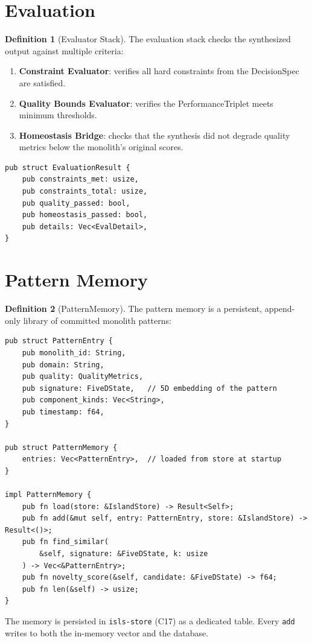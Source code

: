 \documentclass[11pt,a4paper,twoside]{article}
\theoremstyle{definition}
\newtheorem{definition}{Definition}[section]
\theoremstyle{plain}
\theoremstyle{remark}
\begin{document}
\section{Evaluation}\label{sec:forge:eval}

\begin{definition}[Evaluator Stack]\label{def:evalstack}
The evaluation stack checks the synthesized output against multiple
criteria:
\begin{enumerate}[nosep,label=(\roman*)]
  \item \textbf{Constraint Evaluator}: verifies all hard constraints
        from the DecisionSpec are satisfied.
  \item \textbf{Quality Bounds Evaluator}: verifies the
        PerformanceTriplet meets minimum thresholds.
  \item \textbf{Homeostasis Bridge}: checks that the synthesis did not
        degrade quality metrics below the monolith's original scores.
\end{enumerate}
\begin{lstlisting}
pub struct EvaluationResult {
    pub constraints_met: usize,
    pub constraints_total: usize,
    pub quality_passed: bool,
    pub homeostasis_passed: bool,
    pub details: Vec<EvalDetail>,
}
\end{lstlisting}
\end{definition}


\section{Pattern Memory}\label{sec:forge:memory}

\begin{definition}[PatternMemory]\label{def:patternmem}
The pattern memory is a persistent, append-only library of committed
monolith patterns:
\begin{lstlisting}
pub struct PatternEntry {
    pub monolith_id: String,
    pub domain: String,
    pub quality: QualityMetrics,
    pub signature: FiveDState,   // 5D embedding of the pattern
    pub component_kinds: Vec<String>,
    pub timestamp: f64,
}

pub struct PatternMemory {
    entries: Vec<PatternEntry>,  // loaded from store at startup
}

impl PatternMemory {
    pub fn load(store: &IslandStore) -> Result<Self>;
    pub fn add(&mut self, entry: PatternEntry, store: &IslandStore) -> Result<()>;
    pub fn find_similar(
        &self, signature: &FiveDState, k: usize
    ) -> Vec<&PatternEntry>;
    pub fn novelty_score(&self, candidate: &FiveDState) -> f64;
    pub fn len(&self) -> usize;
}
\end{lstlisting}
The memory is persisted in \texttt{isls-store} (C17) as a dedicated
table. Every \texttt{add} writes to both the in-memory vector and the
database.
\end{definition}
\end{document}
